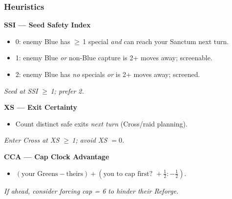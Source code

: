 \documentclass[11pt]{article}
\begin{document}
\begin{multicols}{2}
\subsubsection*{Heuristics}
\textbf{SSI — Seed Safety Index}
\begin{itemize}[leftmargin=1.1em,itemsep=0.15em]
  \item 0: enemy Blue has $\geq$\,1 special \emph{and} can reach your Sanctum next turn.
  \item 1: enemy Blue \emph{or} non-Blue capture is 2+ moves away; screenable.
  \item 2: enemy Blue has \emph{no} specials \emph{or} is 2+ moves away; screened.
\end{itemize}
\emph{Seed at SSI $\geq$\,1; prefer 2.}

\textbf{XS — Exit Certainty}
\begin{itemize}[leftmargin=1.1em,itemsep=0.15em]
  \item Count distinct safe exits \emph{next turn} (Cross/raid planning).
\end{itemize}
\emph{Enter Cross at XS $\geq$\,1; avoid XS $=0$.}

\textbf{CCA — Cap Clock Advantage}
\begin{itemize}[leftmargin=1.1em,itemsep=0.15em]
  \item $(\text{your Greens} - \text{theirs}) + (\text{you to cap first? } +\tfrac12 : -\tfrac12)$.
\end{itemize}
\emph{If ahead, consider forcing cap = 6 to hinder their Reforge.}
\end{multicols}

\newcommand{\slot}{\rule{1.1em}{0.4pt}}
\end{document}
